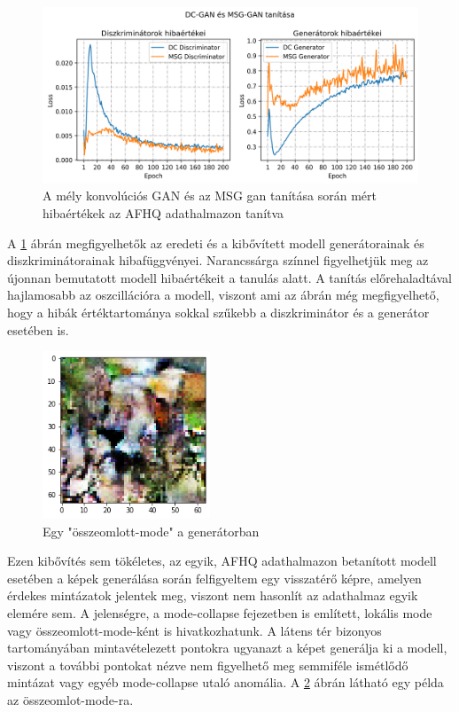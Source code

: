 \begin{figure}[h]
	\centering
	\includegraphics[width=15cm]{images/dc_vs_msg.png}
	\caption{A mély konvolúciós GAN és az MSG gan tanítása során mért hibaértékek az AFHQ adathalmazon tanítva}
	\label{fig:dcvsmsg}
\end{figure}

A \ref{fig:dcvsmsg} ábrán megfigyelhetők az eredeti és a kibővített modell generátorainak és diszkriminátorainak hibafüggvényei. Narancssárga színnel figyelhetjük meg az újonnan bemutatott modell hibaértékeit a tanulás alatt. A tanítás előrehaladtával hajlamosabb az oszcillációra a modell, viszont ami az ábrán még megfigyelhető, hogy a hibák értéktartománya sokkal szűkebb a diszkriminátor és a generátor esetében is.

\begin{figure}[h]
	\centering
	\includegraphics[width=5cm]{images/collapsed_mode.png}
	\caption{Egy "összeomlott-mode" a generátorban}
	\label{fig:collapsed_mode}
\end{figure}

Ezen kibővítés sem tökéletes, az egyik, AFHQ adathalmazon betanított modell esetében a képek generálása során felfigyeltem egy visszatérő képre, amelyen érdekes mintázatok jelentek meg, viszont nem hasonlít az adathalmaz egyik elemére sem. A jelenségre, a mode-collapse fejezetben is említett, lokális mode vagy összeomlott-mode-ként is hivatkozhatunk. A látens tér bizonyos tartományában mintavételezett pontokra ugyanazt a képet generálja ki a modell, viszont a további pontokat nézve nem figyelhető meg semmiféle ismétlődő mintázat vagy egyéb mode-collapse utaló anomália. A \ref{fig:collapsed_mode} ábrán látható egy példa az összeomlot-mode-ra. 

